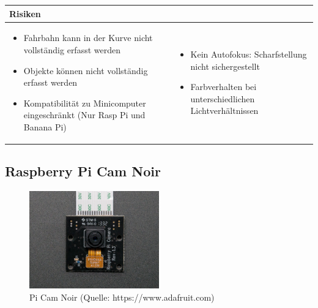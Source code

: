 \begin{table}[h]
\begin{tabular}{p{}p{}}


 \textbf{Risiken} & \\ \hline
	 
\begin{itemize}
\item Fahrbahn kann in der Kurve nicht vollständig erfasst werden
\item Objekte können nicht vollständig erfasst werden
\item Kompatibilität zu Minicomputer eingeschränkt (Nur Rasp Pi und Banana Pi)
\end{itemize}
&
\begin{itemize}
\item Kein Autofokus: Scharfstellung nicht sichergestellt
\item Farbverhalten bei unterschiedlichen Lichtverhältnissen 
\end{itemize}

 
\end{tabular}
\end{table}

\pagebreak

\subsection{Raspberry Pi Cam Noir}

\begin{figure}[h!]%
\centering
\includegraphics[width=0.5\textwidth]{fig/raspberry-pi-camera-noir.jpg}
\caption{Pi Cam Noir (Quelle: https://www.adafruit.com)}
\label{fig:PiCamNoir}
\end{figure}

